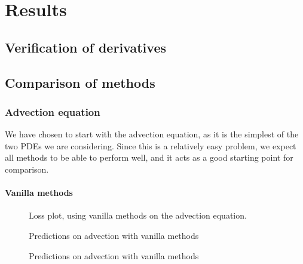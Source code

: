 \chapter{Results}

\section{Verification of derivatives}



\section{Comparison of methods}

\subsection{Advection equation}

We have chosen to start with the advection equation, as it is the simplest of the two PDEs we are considering.
Since this is a relatively easy problem, we expect all methods to be able to perform well, and it acts as a good starting point for comparison.

\subsubsection{Vanilla methods}

\begin{figure*}[h!]
    \centering
    
    \caption[Loss plot, using vanilla methods on the advection equation]{Loss plot, using vanilla methods on the advection equation.}
    \label{fig:loss_plot_kdv}
\end{figure*}

\newpage

\begin{figure*}[h!]
    
    \caption[Predictions on advection with vanilla methods]{Predictions on advection with vanilla methods}
    \label{fig:pred_kdv_vanilla}
\end{figure*}

\begin{figure*}[h!]
    
    \caption[Predictions on advection with vanilla methods]{Predictions on advection with vanilla methods}
    \label{fig:pred_kdv_vanilla_imshow}
\end{figure*}


